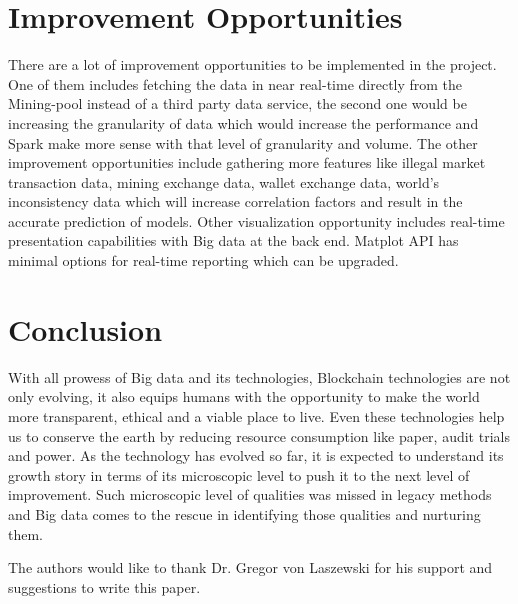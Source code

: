 \documentclass[sigconf]{acmart}
\begin{document}
\section{Improvement Opportunities}
There are a lot of improvement opportunities to be implemented in the project. One of them includes fetching the data in near real-time directly from the Mining-pool instead of a third party data service, the second one would be increasing the granularity of data which would increase the performance and  Spark make more sense with that level of granularity and volume. The other improvement opportunities include gathering more features like illegal market transaction data, mining exchange data, wallet exchange data, world's inconsistency data which will increase correlation factors and result in the accurate prediction of models. Other visualization opportunity includes real-time presentation capabilities with Big data at the back end. Matplot API has minimal options for real-time reporting which can be upgraded.

\section{Conclusion}

With all prowess of Big data and its technologies, Blockchain technologies are not only evolving, it also equips humans with the opportunity to make the world more transparent, ethical and a viable place to live. Even these technologies help us to conserve the earth by reducing resource consumption like paper, audit trials and power. As the technology has evolved so far, it is expected to understand its growth story in terms of its microscopic level to push it to the next level of improvement. Such microscopic level of qualities was missed in legacy methods and Big data comes to the rescue in identifying those qualities and nurturing them.


\begin{acks}
  The authors would like to thank Dr. Gregor von Laszewski for his support and suggestions to write this paper.
\end{acks}


 
\end{document}
